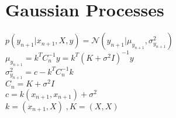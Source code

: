 \section{Gaussian Processes}

$p(y_{n+1}|x_{n+1},X, y) = \mathcal{N} (y_{n+1}|\mu_{y_{n+1}}, \sigma_{y_{n+1}}^2)$
\\$\mu_{y_{n+1}} = k^T C_{n}^{-1}y= k^T(K+\sigma^2 I)^{-1}y$
\\$\sigma_{y_{n+1}}^2 = c - k^TC_n^{-1}k$
\\ $C_n = K + \sigma^2I$
\\ $c = k(x_{n+1},x_{n+1}) + \sigma^2$
\\ $k =(x_{n+1},X) \;,  K= (X,X)$





